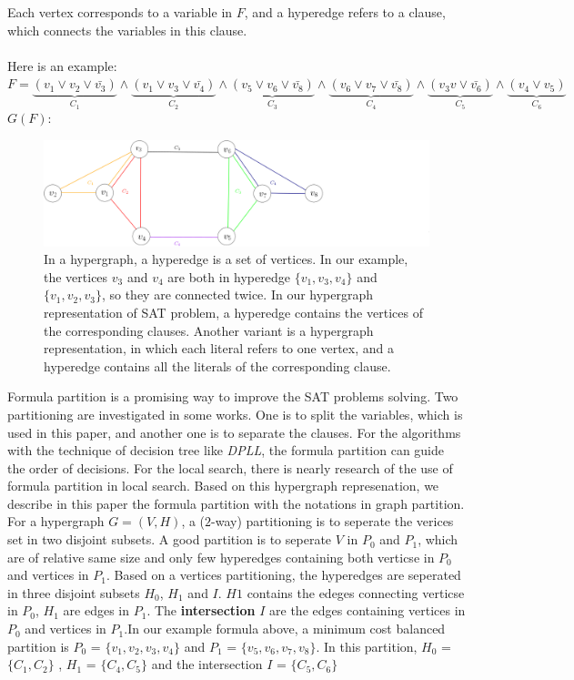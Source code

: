 \documentclass[12pt,a4paper,twoside]{scrartcl}
\numberwithin{equation}{section}
\begin{document}
  Each vertex corresponds to a variable in $F$, and a hyperedge refers to a clause, which connects the variables in this clause. \\
\\
Here is an example:\\
$F =\underbrace{(v_1 \lor v_2 \lor \bar{v_3})}_\text{$C_1$} \land \underbrace{(v_1 \lor v_3\lor \bar{v_4})}_\text{$C_2$}\land \underbrace{(v_5 \lor v_6\lor \bar{v_8})}_\text{$C_3$}\land \underbrace{(v_6 \lor v_7\lor \bar{v_8})}_\text{$C_4$}\land \underbrace{(v_3v\lor \bar{v_6})}_\text{$C_5$}\land \underbrace{(v_4 \lor v_5)}_\text{$C_6$}$\\
$G(F)$:
\begin{figure}[H]
\begin{center}
  \includegraphics[scale = 0.4]{1/hypergraph.png}
  \end{center}
  \caption{In a hypergraph, a hyperedge is a set of vertices. In our example, the vertices  $v_3$  and $v_4$ are both in hyperedge $\{v_1, v_3, v_4\}$ and $\{v_1, v_2, v_3\}$, so they are connected twice. In our hypergraph representation of SAT problem, a hyperedge contains the vertices of the corresponding clauses. Another variant is a hypergraph representation, in which each literal refers to one vertex, and a hyperedge contains all the literals of the corresponding clause.}
  \label{hypergraph representation}
  \end{figure}

Formula partition is a promising way to improve the SAT problems solving. Two partitioning are investigated in some works. One is to split the variables, which is used in this paper, and another one is to separate the clauses. For the algorithms with the technique of decision tree like \emph{DPLL}, the formula partition can guide the order of decisions. For the local search, there is nearly research of the use of formula partition in local search. Based on this hypergraph represenation, we describe in this paper the formula partition with the notations in graph partition. For a hypergraph $G = (V,H)$,  a ($2$-way) partitioning is to seperate the verices set in two disjoint subsets. A good partition is to seperate $V$ in $P_0$ and $P_1$, which are of relative same size and only few hyperedges containing both verticse in $P_0$ and vertices in $P_1$.  Based on a vertices partitioning, the hyperedges are seperated in three disjoint subsets $H_0$, $H_1$ and $I$. $H1$ contains the edeges connecting verticse in $P_0$, $H_1$ are edges in $P_1$. The \textbf{intersection} $I$ are the edges containing vertices in $P_0$ and vertices in $P_1$.In our example formula above, a minimum cost balanced partition is $P_0$ = $\{v_1,v_2, v_3, v_4\}$ and $P_1$ = $\{v_5,v_6, v_7, v_8\}$. In this partition, $H_0$ = $\{C_1,C_2\}$ , $H_1$ = $\{C_4,C_5\}$ and the intersection $I$ = $\{C_5,C_6\}$ 
\end{document}
